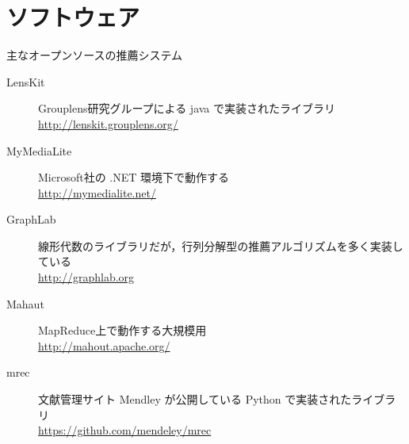 \section{ソフトウェア}
\label{sec:reference-software}

主なオープンソースの推薦システム
\begin{description}
\item[LensKit]
Grouplens研究グループによる java で実装されたライブラリ\\
\url{http://lenskit.grouplens.org/}
\item[MyMediaLite]
Microsoft社の .NET 環境下で動作する\\
\url{http://mymedialite.net/}
\item[GraphLab]
線形代数のライブラリだが，行列分解型の推薦アルゴリズムを多く実装している\\
\url{http://graphlab.org}
\item[Mahaut] MapReduce上で動作する大規模用\\
\url{http://mahout.apache.org/}
\item[mrec] 文献管理サイト Mendley が公開している Python で実装されたライブラリ\\
\url{https://github.com/mendeley/mrec}
\end{description}
